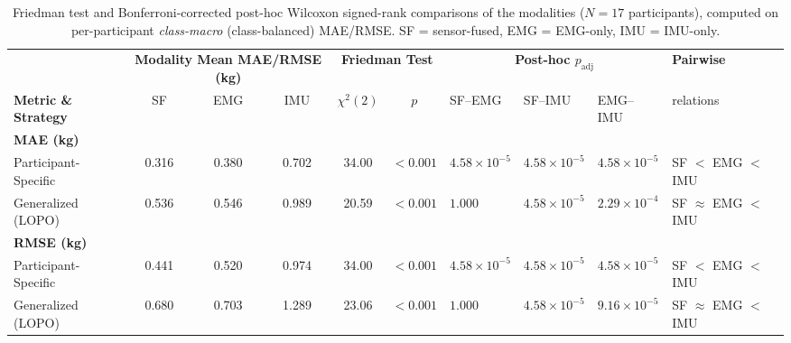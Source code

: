 \begin{table}[h]
    \centering
    \small
    \caption{Friedman test and Bonferroni-corrected post-hoc Wilcoxon signed-rank comparisons of the modalities ($N=17$ participants), computed on per-participant \emph{class-macro} (class-balanced) MAE/RMSE. SF = sensor-fused, EMG = EMG-only, IMU = IMU-only.}
    \label{tab:anova_results}
    \begin{tabularx}{\textwidth}{l c c c c c >{\centering\arraybackslash}X >{\centering\arraybackslash}X >{\centering\arraybackslash}X >{\centering\arraybackslash}p{2.6cm}}
        \toprule
        & \multicolumn{3}{c}{\textbf{Modality Mean MAE/RMSE (kg)}} & \multicolumn{2}{c}{\textbf{Friedman Test}} & \multicolumn{3}{c}{\textbf{Post-hoc $p_{\text{adj}}$}} & \textbf{Pairwise} \\
        \cmidrule(lr){2-4} \cmidrule(lr){5-6} \cmidrule(lr){7-9} \cmidrule(lr){10-10}
        \textbf{Metric \& Strategy} & SF & EMG & IMU & $\chi^2(2)$ & $p$ & SF--EMG & SF--IMU & EMG--IMU & relations \\
        \midrule
        \textbf{MAE (kg)} \\
        \quad Participant-Specific & 0.316 & 0.380 & 0.702 & 34.00 & $<0.001$ & $4.58\times10^{-5}$ & $4.58\times10^{-5}$ & $4.58\times10^{-5}$ & SF $<$ EMG $<$ IMU \\
        \quad Generalized (LOPO)      & 0.536 & 0.546 & 0.989 & 20.59 & $<0.001$ & $1.000$            & $4.58\times10^{-5}$ & $2.29\times10^{-4}$ & SF $\approx$ EMG $<$ IMU \\
        \midrule
        \textbf{RMSE (kg)} \\
        \quad Participant-Specific & 0.441 & 0.520 & 0.974 & 34.00 & $<0.001$ & $4.58\times10^{-5}$ & $4.58\times10^{-5}$ & $4.58\times10^{-5}$ & SF $<$ EMG $<$ IMU \\
        \quad Generalized (LOPO)      & 0.680 & 0.703 & 1.289 & 23.06 & $<0.001$ & $1.000$            & $4.58\times10^{-5}$ & $9.16\times10^{-5}$ & SF $\approx$ EMG $<$ IMU \\
        \bottomrule
    \end{tabularx}
\end{table}

